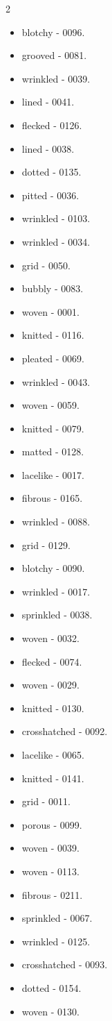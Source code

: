 \begin{multicols}{2}
\begin{itemize}
\item blotchy - 0096.
\item grooved - 0081.
\item wrinkled - 0039.
\item lined - 0041.
\item flecked - 0126.
\item lined - 0038.
\item dotted - 0135.
\item pitted - 0036.
\item wrinkled - 0103.
\item wrinkled - 0034.
\item grid - 0050.
\item bubbly - 0083.
\item woven - 0001.
\item knitted - 0116.
\item pleated - 0069.
\item wrinkled - 0043.
\item woven - 0059.
\item knitted - 0079.
\item matted - 0128.
\item lacelike - 0017.
\item fibrous - 0165.
\item wrinkled - 0088.
\item grid - 0129.
\item blotchy - 0090.
\item wrinkled - 0017.
\item sprinkled - 0038.
\item woven - 0032.
\item flecked - 0074.
\item woven - 0029.
\item knitted - 0130.
\item crosshatched - 0092.
\item lacelike - 0065.
\item knitted - 0141.
\item grid - 0011.
\item porous - 0099.
\item woven - 0039.
\item woven - 0113.
\item fibrous - 0211.
\item sprinkled - 0067.
\item wrinkled - 0125.
\item crosshatched - 0093.
\item dotted - 0154.
\item woven - 0130.

\end{itemize}
\end{multicols}
